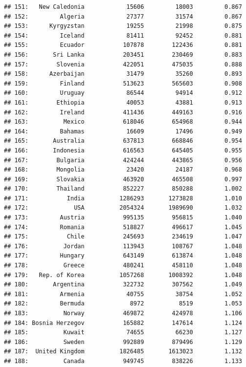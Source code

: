 \documentclass[10pt,]{article}
\begin{document}
\begin{verbatim}
## 151:   New Caledonia            15606         18003         0.867
## 152:         Algeria            27377         31574         0.867
## 153:      Kyrgyzstan            19255         21998         0.875
## 154:         Iceland            81411         92452         0.881
## 155:         Ecuador           107878        122436         0.881
## 156:       Sri Lanka           203451        230469         0.883
## 157:        Slovenia           422051        475035         0.888
## 158:      Azerbaijan            31479         35260         0.893
## 159:         Finland           513623        565603         0.908
## 160:         Uruguay            86544         94914         0.912
## 161:        Ethiopia            40053         43881         0.913
## 162:         Ireland           411436        449163         0.916
## 163:          Mexico           618046        654968         0.944
## 164:         Bahamas            16609         17496         0.949
## 165:       Australia           637813        668846         0.954
## 166:       Indonesia           616563        645405         0.955
## 167:        Bulgaria           424244        443865         0.956
## 168:        Mongolia            23420         24187         0.968
## 169:        Slovakia           463920        465508         0.997
## 170:        Thailand           852227        850288         1.002
## 171:           India          1286293       1273828         1.010
## 172:             USA          2054324       1989690         1.032
## 173:         Austria           995135        956815         1.040
## 174:         Romania           518827        496617         1.045
## 175:           Chile           245693        234619         1.047
## 176:          Jordan           113943        108767         1.048
## 177:         Hungary           643149        613874         1.048
## 178:          Greece           480241        458110         1.048
## 179:   Rep. of Korea          1057268       1008392         1.048
## 180:       Argentina           322732        307562         1.049
## 181:         Armenia            40755         38754         1.052
## 182:         Bermuda             8972          8519         1.053
## 183:          Norway           469872        424978         1.106
## 184: Bosnia Herzegov           165882        147614         1.124
## 185:          Kuwait            74655         66230         1.127
## 186:          Sweden           992889        879496         1.129
## 187:  United Kingdom          1826485       1613023         1.132
## 188:          Canada           949745        838226         1.133

\end{verbatim}
\end{document}
